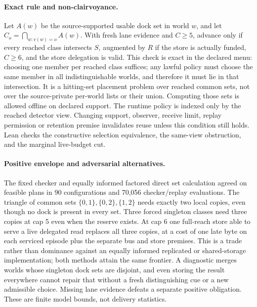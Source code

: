 \documentclass{article}
\begin{document}
\paragraph{Exact rule and non-clairvoyance.}
Let \(A(w)\) be the source-supported usable dock set in world \(w\), and let \(C_o=\bigcap_{w:v(w)=o} A(w)\). With fresh lane evidence and \(C\ge5\), advance only if every reached class intersects \(S\), augmented by \(R\) if the store is actually funded, \(C\ge6\), and the store delegation is valid. This check is exact in the declared menu: choosing one member per reached class suffices; any lawful policy must choose the same member in all indistinguishable worlds, and therefore it must lie in that intersection. It is a hitting-set placement problem over reached common sets, not over the source-private per-world lists or their union. Computing those sets is allowed offline on declared support. The runtime policy is indexed only by the reached detector view. Changing support, observer, receive limit, replay permission or retention premise invalidates reuse unless this condition still holds. Lean checks the constructive selection equivalence, the same-view obstruction, and the marginal live-budget cut.

\paragraph{Positive envelope and adversarial alternatives.}
The fixed checker and equally informed factored direct set calculation agreed on feasible plans in 90 configurations and 70,056 checker/replay evaluations. The triangle of common sets \(\{0,1\},\{0,2\},\{1,2\}\) needs exactly two local copies, even though no dock is present in every set. Three forced singleton classes need three copies at cap 5 even when the reserve exists. At cap 6 one full-reach store able to serve a live delegated read replaces all three copies, at a cost of one late byte on each serviced episode plus the separate bus and store premises. This is a trade rather than dominance against an equally informed replicated or shared-storage implementation; both methods attain the same frontier. A diagnostic merges worlds whose singleton dock sets are disjoint, and even storing the result everywhere cannot repair that without a fresh distinguishing cue or a new admissible choice. Missing lane evidence defeats a separate positive obligation. These are finite model bounds, not delivery statistics.
\end{document}
